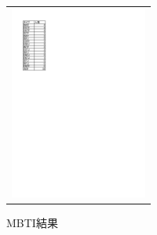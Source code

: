 \documentclass[uplatex]{jsarticle}
\begin{document}
\begin{figure}[h]
   \begin{tabular}{c}

      \begin{minipage}{0.33\hsize}
        \begin{center}
   \includegraphics[width=4.5cm,clip]{wariai.pdf}
  \caption{MBTI結果}
  \label{wariai}
  \end{center}
 \end{minipage}


\end{tabular}
\end{figure}
\end{document}
